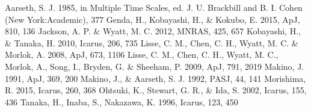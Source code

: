 \documentclass[a4paper,10pt,oneside,twocolumn,notitlepage,final]{jarticle}
\begin{document}
\small
\begin{thebibliography}{99}
 Aarseth, S. J. 1985, in Multiple Time Scales, ed. J. U. Brackbill and B. I. Cohen (New York:Academic), 377
 Genda, H., Kobayashi, H., \& Kokubo, E. 2015, ApJ, 810, 136
 Jackson, A. P. \& Wyatt, M. C. 2012, MNRAS, 425, 657
 Kobayashi, H., \& Tanaka, H. 2010, Icarus, 206, 735
 Lisse, C. M., Chen, C. H., Wyatt, M. C. \& Morlok, A. 2008, ApJ, 673, 1106
 Lisse, C. M., Chen, C. H., Wyatt, M. C., Morlok, A., Song, I., Bryden, G. \& Sheeham, P. 2009, ApJ, 791, 2019
 Makino, J. 1991, ApJ, 369, 200
 Makino, J., \& Aarseth, S. J. 1992, PASJ, 44, 141
 Morishima, R. 2015, Icarus, 260, 368
 Ohtsuki, K., Stewart, G. R., \& Ida, S. 2002, Icarus, 155, 436
 Tanaka, H., Inaba, S., Nakazawa, K. 1996, Icarus, 123, 450
 
\end{thebibliography}
\end{document}
